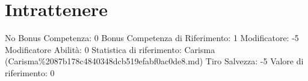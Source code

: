 \section{Intrattenere}\label{intrattenere}

\begin{description}
\tightlist
\item[Tags: ABI]
No Bonus Competenza: 0 Bonus Competenza di Riferimento: 1 Modificatore:
-5 Modificatore Abilità: 0 Statistica di riferimento: Carisma
(Carisma\%2087b178c4840348dcb519efabf0ac0de8.md) Tiro Salvezza: -5
Valore di riferimento: 0
\end{description}
